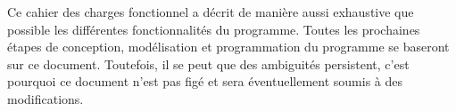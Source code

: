 Ce cahier des charges fonctionnel a décrit de manière aussi exhaustive que possible les différentes fonctionnalités du programme. Toutes les prochaines étapes de conception, modélisation et programmation du programme se baseront sur ce document. Toutefois, il se peut que des ambiguités persistent, c'est pourquoi ce document n'est pas figé et sera éventuellement soumis à des modifications.